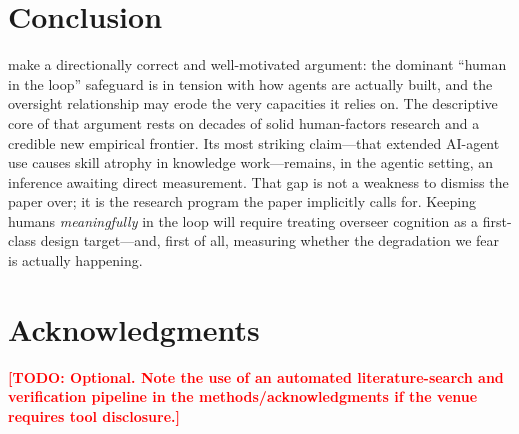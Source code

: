 \documentclass[11pt]{article}
\newcommand{\todo}[1]{\textcolor{red}{\textbf{[TODO: #1]}}}
\begin{document}
\section{Conclusion}
\label{sec:conclusion}

\citet{mitchell2026agents} make a directionally correct and well-motivated argument: the
dominant ``human in the loop'' safeguard is in tension with how agents are actually built,
and the oversight relationship may erode the very capacities it relies on. The descriptive
core of that argument rests on decades of solid human-factors research and a credible new
empirical frontier. Its most striking claim---that extended AI-agent use causes skill
atrophy in knowledge work---remains, in the agentic setting, an inference awaiting direct
measurement. That gap is not a weakness to dismiss the paper over; it is the research
program the paper implicitly calls for. Keeping humans \emph{meaningfully} in the loop will
require treating overseer cognition as a first-class design target---and, first of all,
measuring whether the degradation we fear is actually happening.

\section*{Acknowledgments}
\todo{Optional. Note the use of an automated literature-search and verification pipeline in
the methods/acknowledgments if the venue requires tool disclosure.}



\end{document}
